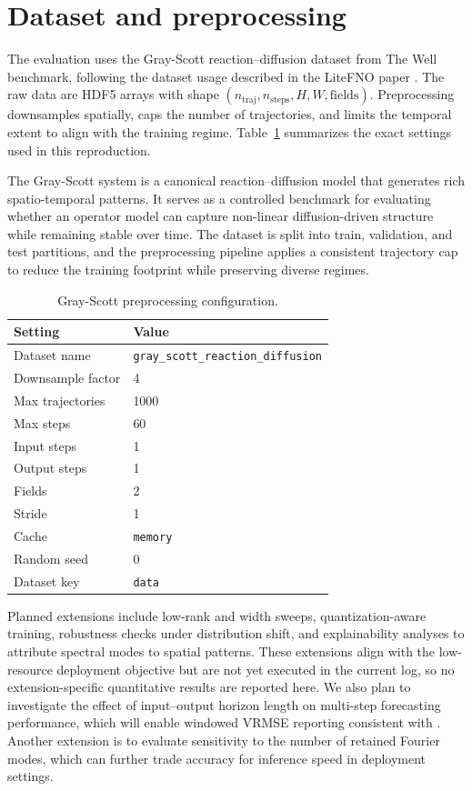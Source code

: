 \documentclass[11pt]{article}
\begin{document}
\section{Dataset and preprocessing}
The evaluation uses the Gray-Scott reaction--diffusion dataset from The Well
benchmark, following the dataset usage described in the LiteFNO paper
\cite{litefno2025}. The raw data are HDF5 arrays with shape
\((n_{\text{traj}}, n_{\text{steps}}, H, W, \text{fields})\). Preprocessing
downsamples spatially, caps the number of trajectories, and limits the temporal
extent to align with the training regime. Table~\ref{tab:dataset} summarizes the
exact settings used in this reproduction.

The Gray-Scott system is a canonical reaction--diffusion model that generates
rich spatio-temporal patterns. It serves as a controlled benchmark for
evaluating whether an operator model can capture non-linear diffusion-driven
structure while remaining stable over time. The dataset is split into train,
validation, and test partitions, and the preprocessing pipeline applies a
consistent trajectory cap to reduce the training footprint while preserving
diverse regimes.

\begin{table}[t]
  \centering
  \caption{Gray-Scott preprocessing configuration.}
  \label{tab:dataset}
  \begin{tabular}{ll}
    \toprule
    Setting & Value \\
    \midrule
    Dataset name & \texttt{gray\_scott\_reaction\_diffusion} \\
    Downsample factor & 4 \\
    Max trajectories & 1000 \\
    Max steps & 60 \\
    Input steps & 1 \\
    Output steps & 1 \\
    Fields & 2 \\
    Stride & 1 \\
    Cache & \texttt{memory} \\
    Random seed & 0 \\
    Dataset key & \texttt{data} \\
    \bottomrule
  \end{tabular}
\end{table}

Planned extensions include low-rank and width sweeps, quantization-aware
training, robustness checks under distribution shift, and explainability
analyses to attribute spectral modes to spatial patterns. These extensions align
with the low-resource deployment objective but are not yet executed in the
current log, so no extension-specific quantitative results are reported here.
We also plan to investigate the effect of input--output horizon length on
multi-step forecasting performance, which will enable windowed VRMSE reporting
consistent with \cite{litefno2025}. Another extension is to evaluate sensitivity
to the number of retained Fourier modes, which can further trade accuracy for
inference speed in deployment settings.
\end{document}
